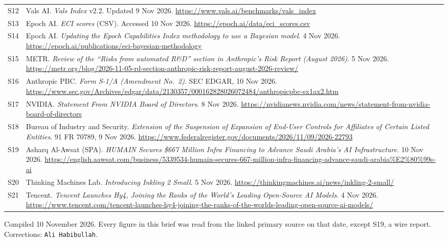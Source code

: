 \documentclass[11pt,a4paper]{article}
\newcommand{\briefdate}{10 November 2026}            %
\newcommand{\briefauthor}{Ali Habibullah}          %
\begin{document}
{\begin{tabularx}{\textwidth}{@{}l X@{}}
S12 & Vals AI. \emph{Vals Index} v2.2. Updated 9 Nov 2026. \url{https://www.vals.ai/benchmarks/vals_index} \\
S13 & Epoch AI. \emph{ECI scores} (CSV). Accessed 10 Nov 2026. \url{https://epoch.ai/data/eci_scores.csv} \\
S14 & Epoch AI. \emph{Updating the Epoch Capabilities Index methodology to use a Bayesian model}. 4 Nov 2026. \url{https://epoch.ai/publications/eci-bayesian-methodology} \\
S15 & METR. \emph{Review of the ``Risks from automated R\&D'' section in Anthropic's Risk Report (August 2026)}. 5 Nov 2026. \url{https://metr.org/blog/2026-11-05-rd-section-anthropic-risk-report-august-2026-review/} \\
S16 & Anthropic PBC. \emph{Form S-1/A (Amendment No.\ 2)}. SEC EDGAR, 10 Nov 2026. \url{https://www.sec.gov/Archives/edgar/data/2130357/000162828026072484/anthropicpbc-sx1ax2.htm} \\
S17 & NVIDIA. \emph{Statement From NVIDIA Board of Directors}. 8 Nov 2026. \url{https://nvidianews.nvidia.com/news/statement-from-nvidia-board-of-directors} \\
S18 & Bureau of Industry and Security. \emph{Extension of the Suspension of Expansion of End-User Controls for Affiliates of Certain Listed Entities}. 91 FR 70789, 9 Nov 2026. \url{https://www.federalregister.gov/documents/2026/11/09/2026-22793} \\
S19 & Asharq Al-Awsat (SPA). \emph{HUMAIN Secures \$667 Million Infra Financing to Advance Saudi Arabia's AI Infrastructure}. 10 Nov 2026. \url{https://english.aawsat.com/business/5339534-humain-secures-667-million-infra-financing-advance-saudi-arabia\%E2\%80\%99s-ai} \\
S20 & Thinking Machines Lab. \emph{Introducing Inkling 2 Small}. 5 Nov 2026. \url{https://thinkingmachines.ai/news/inkling-2-small/} \\
S21 & Tencent. \emph{Tencent Launches Hy4, Joining the Ranks of the World's Leading Open-Source AI Models}. 4 Nov 2026. \url{https://www.tencent.com/tencent-launches-hy4-joining-the-ranks-of-the-worlds-leading-open-source-ai-models/} \\
\bottomrule
\end{tabularx}}

\vspace{0.4em}
{\footnotesize\color{brandgrey}
Compiled \briefdate. Every figure in this brief was read from the linked primary
source on that date, except S19, a wire report. Corrections: \texttt{\briefauthor}.}
\end{document}
